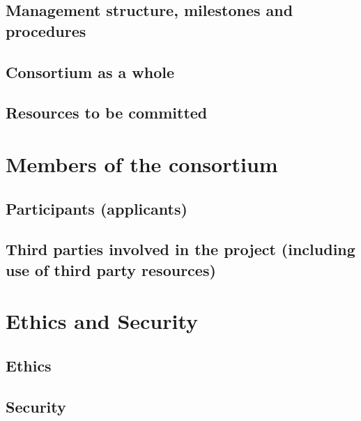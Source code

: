 \documentclass[12pt]{book}
\begin{document}
\section{Management structure, milestones and procedures}


 
\section{Consortium as a whole}

\section{Resources to be committed}

\chapter{Members of the consortium}

\section{Participants (applicants)}



\section{Third parties involved in the project (including use of third party resources)}


\chapter{Ethics and Security}

\section{Ethics}

\section{Security}





\end{document}
